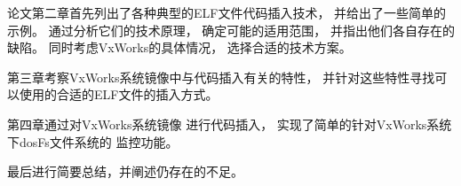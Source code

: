论文第二章首先列出了各种典型的ELF文件代码插入技术，
并给出了一些简单的示例。
通过分析它们的技术原理，
确定可能的适用范围，
并指出他们各自存在的缺陷。
同时考虑VxWorks的具体情况，
选择合适的技术方案。

第三章考察VxWorks系统镜像中与代码插入有关的特性，
并针对这些特性寻找可以使用的合适的ELF文件的插入方式。

第四章通过对VxWorks系统镜像
进行代码插入，
实现了简单的针对VxWorks系统下dosFs文件系统的
监控功能。

最后进行简要总结，并阐述仍存在的不足。

